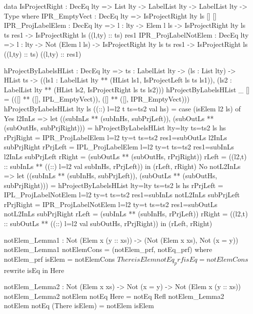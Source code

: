\begin{code}
data IsProjectRight : DecEq lty => List lty -> LabelList lty -> 
  LabelList lty -> Type where
  IPR_EmptyVect : DecEq lty => IsProjectRight {lty} ls [] []
  IPR_ProjLabelElem : DecEq lty => {l : lty} -> Elem l ls -> 
    IsProjectRight {lty} ls ts res1 -> 
    IsProjectRight ls ((l,ty) :: ts) res1      
  IPR_ProjLabelNotElem : DecEq lty => {l : lty} -> 
    Not (Elem l ls) -> IsProjectRight {lty} ls ts res1 -> 
    IsProjectRight ls ((l,ty) :: ts) ((l,ty) :: res1)
            
hProjectByLabelsHList : DecEq lty => {ts : LabelList lty} -> 
  (ls : List lty) -> HList ts ->     
  ((ls1 : LabelList lty ** (HList ls1, IsProjectLeft ls ts ls1)),
  (ls2 : LabelList lty ** (HList ls2, IsProjectRight ls ts ls2)))
hProjectByLabelsHList _ [] =
                   (([] ** ([], IPL_EmptyVect)),
                   ([] ** ([], IPR_EmptyVect)))
hProjectByLabelsHList {lty} ls ((::) {l=l2} {t} {ts=ts2} val hs) =
  case (isElem l2 ls) of
    Yes l2InLs =>
      let
        ((subInLs ** (subInHs, subPrjLeft)), 
          (subOutLs ** (subOutHs, subPrjRight))) =
          hProjectByLabelsHList {lty=lty} {ts=ts2} ls hs
        rPrjRight = IPR_ProjLabelElem {l=l2} {ty=t} {ts=ts2} 
          {res1=subOutLs} l2InLs subPrjRight
        rPrjLeft = IPL_ProjLabelElem {l=l2} {ty=t} {ts=ts2} 
          {res1=subInLs} l2InLs subPrjLeft
        rRight = (subOutLs ** (subOutHs, rPrjRight))
        rLeft = ((l2,t) :: subInLs ** ((::) {l=l2} val subInHs, rPrjLeft))
       in
         (rLeft, rRight)
    No notL2InLs =>
      let
        ((subInLs ** (subInHs, subPrjLeft)), 
          (subOutLs ** (subOutHs, subPrjRight))) =
          hProjectByLabelsHList {lty=lty} {ts=ts2} ls hs
        rPrjLeft = IPL_ProjLabelNotElem {l=l2} {ty=t} {ts=ts2} 
          {res1=subInLs} notL2InLs subPrjLeft
        rPrjRight = IPR_ProjLabelNotElem {l=l2} {ty=t} {ts=ts2} 
          {res1=subOutLs} notL2InLs subPrjRight
        rLeft = (subInLs ** (subInHs, rPrjLeft))
        rRight = ((l2,t) :: subOutLs ** 
          ((::) {l=l2} val subOutHs, rPrjRight))
      in
        (rLeft, rRight)
    
notElem_Lemma1 : Not (Elem x (y :: xs)) -> 
  (Not (Elem x xs), Not (x = y))
notElem_Lemma1 notElemCons = (notElem_prf, notEq_prf)
  where
    notElem_prf isElem = notElemCons $ There isElem
    notEq_prf isEq = notElemCons $ rewrite isEq in Here
    
notElem_Lemma2 : Not (Elem x xs) -> Not (x = y) -> 
  Not (Elem x (y :: xs))
notElem_Lemma2 notElem notEq Here = notEq Refl
notElem_Lemma2 notElem notEq (There isElem) = notElem isElem 
    

\end{code}

